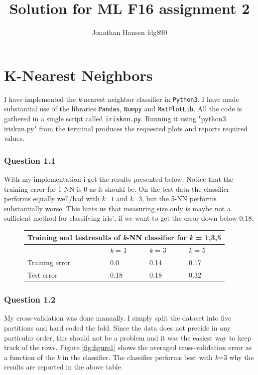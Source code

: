 \documentclass{article}
\begin{document}
\title{Solution for ML F16 assignment 2}
\author{Jonathan Hansen fdg890}
\maketitle

\section{K-Nearest Neighbors}
I have implemented the \textit{k}-nearest neighbor classifier in
\texttt{Python3}. I have made substantial use of the libraries \texttt{Pandas},
\texttt{Numpy} and \texttt{MatPlotLib}. All the code is gathered in a single
script called \texttt{irisknn.py}. Running it using "python3 irisknn.py" from
the terminal produces the requested plots and reports required values.

\subsubsection*{Question 1.1}
With my implementation i get the results presented below. Notice that the
training error for 1-NN is \(0\) as it should be. On the test data the
classifier performs equally well/bad with \textit{k}=\(1\) and \textit{k}=\(3\),
but the 5-NN performs substantially worse. This hints us that measuring size
only is maybe not a sufficient method for classifying iris', if we want to get
the error down below \(0.18\).

\begin{figure}[h]
\centering
\begin{tabular}{ |p{3cm}||p{3cm}|p{3cm}|p{3cm}|  }
 \hline
 \multicolumn{4}{|c|}{Training and testresults of \textit{k}-NN classifier
   for \textit{k} = 1,3,5}\\
 \hline
& \textit{k} = 1 & \textit{k} = 3 & \textit{k} = 5\\
 \hline
 Training error  & 0.0    & 0.14  & 0.17\\
 Test error      & 0.18  & 0.18  & 0.32\\
 \hline
\end{tabular}
\end{figure}

\subsubsection*{Question 1.2}
My cross-validation was done manually. I simply split the dataset into five
partitions and hard coded the fold. Since the data does not precide in any
particular order, this should not be a problem and it was the easiest way to
keep track of the rows. Figure \ref{fig:figure1} shows the averaged
cross-validation error as a function of the \textit{k} in the classifier. The
classifier performs best with \textit{k}=\(3\) why the results are reported in
the above table.
\end{document}
